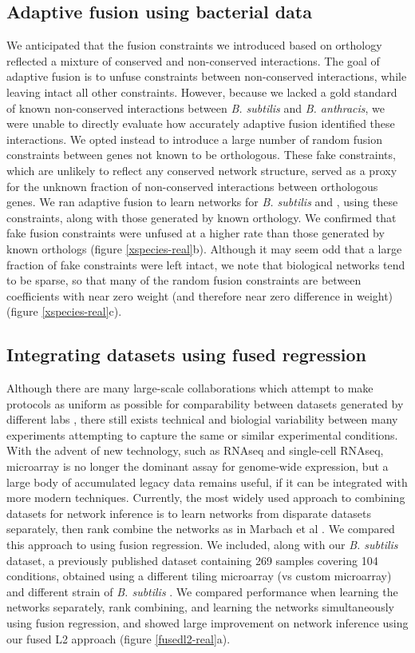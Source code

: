 \documentclass[11pt]{article}
\begin{document}
\subsection{Adaptive fusion using bacterial data}
We anticipated that the fusion constraints we introduced based on orthology reflected a mixture of conserved and non-conserved interactions. The goal of adaptive fusion is to unfuse constraints between non-conserved interactions, while leaving intact all other constraints. However, because we lacked a gold standard of known non-conserved interactions between \textit{B. subtilis} and \textit{B. anthracis}, we were unable to directly evaluate how accurately adaptive fusion identified these interactions. We opted instead to introduce a large number of random fusion constraints between genes not known to be orthologous. These fake constraints, which are unlikely to reflect any conserved network structure, served as a proxy for the unknown fraction of non-conserved interactions between orthologous genes. We ran adaptive fusion to learn networks for \textit{B. subtilis} and , using these constraints, along with those generated by known orthology. We confirmed that fake fusion constraints were unfused at a higher rate than those generated by known orthologs (figure \ref{xspecies-real}b). Although it may seem odd that a large fraction of fake constraints were left intact, we note that biological networks tend to be sparse, so that many of the random fusion constraints are between coefficients with near zero weight (and therefore near zero difference in weight) (figure \ref{xspecies-real}c). 

\subsection{Integrating datasets using fused regression}
Although there are many large-scale collaborations which attempt to make protocols as uniform as possible for comparability between datasets generated by different labs \cite{paten_nih_2015,kundaje_integrative_2015}, there still exists technical and biologial variability between many experiments attempting to capture the same or similar experimental conditions. With the advent of new technology, such as RNAseq and single-cell RNAseq, microarray is no longer the dominant assay for genome-wide expression, but a large body of accumulated legacy data remains useful, if it can be integrated with more modern techniques. Currently, the most widely used approach to combining datasets for network inference is to learn networks from disparate datasets separately, then rank combine the networks as in Marbach et al \cite{marbach_revealing_2010}. We compared this approach to using fusion regression. We included, along with our \textit{B. subtilis} dataset, a previously published dataset containing 269 samples covering 104 conditions, obtained using a different tiling microarray (vs custom microarray) and different strain of \textit{B. subtilis} \cite{nicolas2012condition}. We compared performance when learning the networks separately, rank combining, and learning the networks simultaneously using fusion regression, and showed large improvement on network inference using our fused L2 approach (figure \ref{fusedl2-real}a). 
\end{document}
